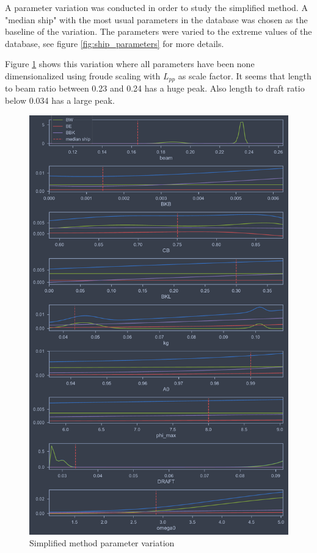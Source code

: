 A parameter variation was conducted in order to study the simplified method.
A "median ship" with the most usual parameters in the database was chosen as the baseline of the variation. The parameters were varied to the extreme values of the database, see figure \ref{fig:ship_parameters} for more details. 

Figure \ref{fig:ikeda_variation} shows this variation where all parameters have been none dimensionalized using froude scaling with $L_{pp}$ as scale factor. 
It seems that length to beam ratio between 0.23 and 0.24 has a huge peak. Also length to draft ratio below 0.034 has a large peak. 

\begin{figure}[H]
    \centering
    \includegraphics[width=0.9\columnwidth]{figures/ikeda_variation.pdf}
    \caption{Simplified method parameter variation}
    \label{fig:ikeda_variation}
\end{figure}

